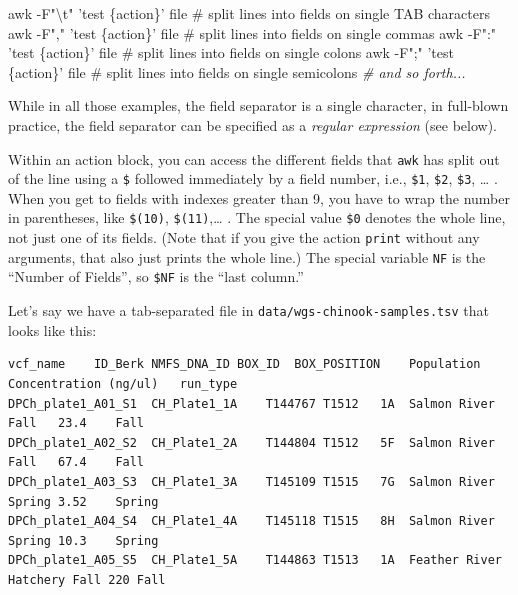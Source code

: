 \documentclass[]{krantz}
\makeatletter
\newenvironment{Shaded}{\begin{snugshade}}{\end{snugshade}}
\newcommand{\CommentTok}[1]{\textcolor[rgb]{0.37,0.37,0.37}{\textit{#1}}}
\newcommand{\FunctionTok}[1]{\textcolor[rgb]{0,0,0}{#1}}
\newcommand{\NormalTok}[1]{#1}
\newcommand{\StringTok}[1]{\textcolor[rgb]{0.5,0.5,0.5}{#1}}
\newenvironment{kframe}{%
\medskip{}
\setlength{\fboxsep}{.8em}
 \def\at@end@of@kframe{}%
 \ifinner\ifhmode%
  \def\at@end@of@kframe{\end{minipage}}%
  \begin{minipage}{\columnwidth}%
 \fi\fi%
 \def\FrameCommand##1{\hskip\@totalleftmargin \hskip-\fboxsep
 \colorbox{shadecolor}{##1}\hskip-\fboxsep
     \hskip-\linewidth \hskip-\@totalleftmargin \hskip\columnwidth}%
 \MakeFramed {\advance\hsize-\width
   \@totalleftmargin\z@ \linewidth\hsize
   \@setminipage}}%
 {\par\unskip\endMakeFramed%
 \at@end@of@kframe}
\renewenvironment{Shaded}{\begin{kframe}}{\end{kframe}}
\makeatother
\begin{document}
\begin{Shaded}
\begin{Highlighting}[]
\FunctionTok{awk}\NormalTok{ -F}\StringTok{"\textbackslash{}t"} \StringTok{'test \{action\}'}\NormalTok{ file  # split lines into fields on single TAB characters}
\FunctionTok{awk}\NormalTok{ -F}\StringTok{","} \StringTok{'test \{action\}'}\NormalTok{ file  # split lines into fields on single commas}
\FunctionTok{awk}\NormalTok{ -F}\StringTok{":"} \StringTok{'test \{action\}'}\NormalTok{ file  # split lines into fields on single colons}
\FunctionTok{awk}\NormalTok{ -F}\StringTok{";"} \StringTok{'test \{action\}'}\NormalTok{ file  # split lines into fields on single semicolons}
\CommentTok{# and so forth...}
\end{Highlighting}
\end{Shaded}

While in all those examples, the field separator is a single character, in full-blown
practice, the field separator can be specified as a \emph{regular expression} (see below).

Within an action block, you can access the different fields that \texttt{awk} has split out
of the line using a \texttt{\$} followed immediately by a field number, i.e., \texttt{\$1}, \texttt{\$2}, \texttt{\$3}, \ldots{} . When you get
to fields with indexes greater than 9, you have to wrap the number in parentheses, like
\texttt{\$(10)}, \texttt{\$(11)},\ldots{} . The special value \texttt{\$0} denotes the whole line, not just one of its
fields. (Note that if you give the action \texttt{print} without any arguments, that also just
prints the whole line.) The special variable \texttt{NF} is the ``Number of Fields'', so
\texttt{\$NF} is the ``last column.''

Let's say we have a tab-separated file in \texttt{data/wgs-chinook-samples.tsv} that looks like this:

\begin{verbatim}
vcf_name    ID_Berk NMFS_DNA_ID BOX_ID  BOX_POSITION    Population  Concentration (ng/ul)   run_type
DPCh_plate1_A01_S1  CH_Plate1_1A    T144767 T1512   1A  Salmon River Fall   23.4    Fall
DPCh_plate1_A02_S2  CH_Plate1_2A    T144804 T1512   5F  Salmon River Fall   67.4    Fall
DPCh_plate1_A03_S3  CH_Plate1_3A    T145109 T1515   7G  Salmon River Spring 3.52    Spring
DPCh_plate1_A04_S4  CH_Plate1_4A    T145118 T1515   8H  Salmon River Spring 10.3    Spring
DPCh_plate1_A05_S5  CH_Plate1_5A    T144863 T1513   1A  Feather River Hatchery Fall 220 Fall
\end{verbatim}
\end{document}
